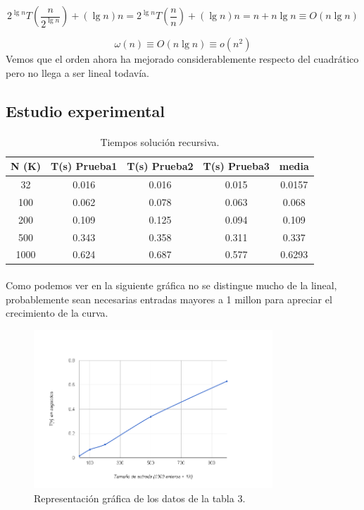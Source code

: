 \documentclass[es]{ifirak}
\begin{document}
$$2^{\lg n}T(\frac{n}{2^{\lg n}}) + ( \lg n)n = 2^{\lg n}T(\frac{n}{n}) + (\lg n)n = n + n \lg n \equiv O(n \lg n) $$

$$ \omega(n) \equiv  O(n \lg n) \equiv o(n^{2})  $$
Vemos que el orden ahora ha mejorado considerablemente respecto del cuadrático pero no llega a ser lineal todavía.
\subsection{Estudio experimental}
\paragraph{}
\begin{table}[htbp]
	\centering
	\begin{tabular}{c|c|c|c|c}
		N (K) & T(s) Prueba1 & T(s) Prueba2 & T(s) Prueba3 & media  \\
		\hline
		32 & 0.016 & 0.016& 0.015 & 0.0157  \\
		100 & 0.062 & 0.078 & 0.063& 0.068 \\
		200 & 0.109 & 0.125 & 0.094 & 0.109 \\
		500 & 0.343 & 0.358 & 0.311 & 0.337 \\
		1000 & 0.624 & 0.687 & 0.577 & 0.6293\\
	\end{tabular}
	\caption{Tiempos solución recursiva.}\label{table}
\end{table}

\paragraph{}
Como podemos ver en la siguiente gráfica no se distingue mucho de la lineal, probablemente sean necesarias entradas mayores a 1 millon para apreciar el crecimiento de la curva.
\newpage
\begin{figure}[htbp]
	\centering
	\includegraphics[width=0.8\textwidth]{logaritmica.png}
	\caption{Representación gráfica de los datos de la tabla 3.}\label{figure}
\end{figure}
\end{document}
